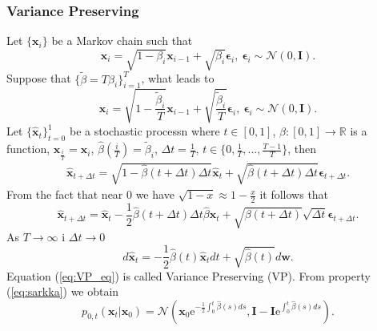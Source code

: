 \documentclass[10pt]{article}
\begin{document}
\subsubsection{Variance Preserving}
Let $\{ \textbf{x}_i \}$ be a Markov chain such that
\begin{equation}
    \textbf{x}_i =   \sqrt{1 - \beta_i }\textbf{x}_{i-1} + \sqrt{\beta_i} \bm{\epsilon}_{i}, \
    \bm{\epsilon}_{i} \sim \mathcal{N}(0, \mathbf{I}).
\end{equation}
Suppose that $ \{ \tilde{\beta} = T\beta_i \}_{i=1}^T$, what leads to
\begin{equation}
    \textbf{x}_i =   \sqrt{1 - \frac{\tilde{\beta}_i}{T} }\textbf{x}_{i-1} + 
    \sqrt{\frac{\tilde{\beta}_i}{T}} \bm{\epsilon}_{i}, \
    \bm{\epsilon}_{i} \sim \mathcal{N}(0, \mathbf{I}).
\end{equation}
Let  $\{ \hat{\textbf{x}}_t \}_{t=0}^1$ be a stochastic processn where $t \in [0,1]$,
$\hat{\beta}:[0, 1] \to \mathbb{R} $ is a function, $ \hat{\textbf{x}}_{\frac{i}{T}} =\textbf{x}_{i}$, $ \hat{\beta}(\frac{i}{T})  = \tilde{\beta}_i$, $\Delta t = \frac{1}{T}$, $t \in \{0, \frac{1}{T}, ...,   \frac{T-1}{T}\}$, then 
\begin{gather}
    \hat{\textbf{x}}_{t + \Delta t} = \sqrt{1 - \hat{\beta}(t + \Delta t) \Delta t  } \hat{\textbf{x}}_{t} + 
     \sqrt{\hat{\beta}(t + \Delta t) \Delta t  } \bm{\epsilon}_{t + \Delta t}.
\end{gather}
From the fact that near 0 we have $\sqrt{1 - x } \approx 1 - \frac{x}{2}$ it follows that
\begin{equation}
      \hat{\textbf{x}}_{t + \Delta t} = \hat{\textbf{x}}_{t} - \frac{1}{2}\hat{\beta}(t + \Delta t) \Delta t \hat{\beta}{\textbf{x}}_{t} + 
     \sqrt{\beta(t + \Delta t)} \sqrt{\Delta t} \bm{\epsilon}_{t + \Delta t}.
\end{equation}
As $T \to \infty$ i $\Delta t \to 0$
\begin{equation}
\label{eq:VP_eq}
    d  \hat{\textbf{x}}_{t} = - \frac{1}{2}\hat{\beta}(t)  \hat{\textbf{x}}_{t} dt + \sqrt{\hat{\beta}(t)} d \textbf{w}.
\end{equation}
Equation (\ref{eq:VP_eq}) is called Variance Preserving (VP).
From property (\ref{eq:sarkka}) we obtain
\begin{equation}
    p_{0,t}(\textbf{x}_t |\textbf{x}_0 ) =
    \mathcal{N}\left(\textbf{x}_0 \text{e}^{-\frac{1}{2}\int_0^t  \hat{\beta}(s)ds},
    \mathbf{I} - \mathbf{I}\text{e}^{\int_0^t  \hat{\beta}(s)ds}\right).
\end{equation}
\end{document}
